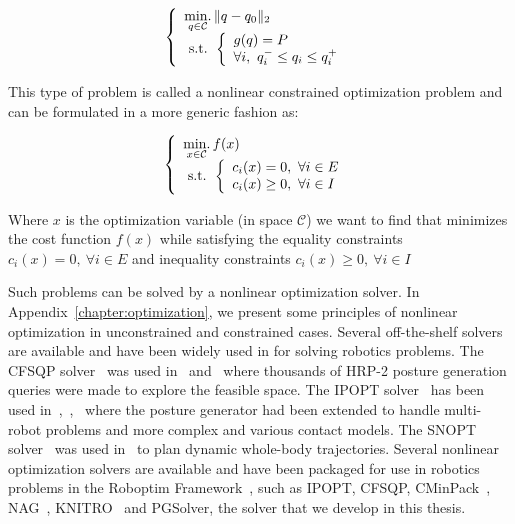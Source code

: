 \begin{equation}
  \left\{
  \begin{array}{l}
    \operatorname*{min.}\limits_{q\in\mathcal{C}}{\|q-q_0\|_2}\\
    \text{ s.t. }
    \left\{
    \begin{array}{l}
      g(q)=P\\
      \forall i,\ q_i^- \leq q_i \leq q_i^+
    \end{array}
    \right.
  \end{array}
  \right.
\end{equation}

This type of problem is called a nonlinear constrained optimization problem and can be formulated in a more generic fashion as:

\begin{equation}
\label{eq:optim_form_PG}
  \left\{
  \begin{array}{l}
    \operatorname*{min.}\limits_{x\in\mathcal{C}}{f(x)}\\
    \text{ s.t. }
    \left\{
    \begin{array}{l}
      c_i(x) = 0,\ \forall i\in{E}\\
      c_i(x) \geq 0,\ \forall i\in{I}\\
    \end{array}
    \right.
  \end{array}
  \right.
\end{equation}

Where $x$ is the optimization variable (in space $\mathcal{C}$) we want to find that minimizes the cost function $f(x)$ while satisfying the equality constraints $c_i(x) = 0,\ \forall i\in{E}$ and inequality constraints $c_i(x) \geq 0,\ \forall i\in{I}$

Such problems can be solved by a nonlinear optimization solver.
In Appendix~\ref{chapter:optimization}, we present some principles of nonlinear optimization in unconstrained and constrained cases.
Several off-the-shelf solvers are available and have been widely used in for solving robotics problems.
The CFSQP solver~\cite{cfsqp:manual} was used in~\cite{escande:iros:2009} and~\cite{escande:ras:2013} where thousands of HRP-2 posture generation queries were made to explore the feasible space.
The IPOPT solver~\cite{wachter:mathprog:2006} has been used in~\cite{vaillant:humanoids:2014},~\cite{vaillant:autonomousrobots:2016},~\cite{bouyarmane:ar:2012} where the posture generator had been extended to handle multi-robot problems and more complex and various contact models.
The SNOPT solver~\cite{gill2005snopt} was used in~\cite{dai2014whole} to plan dynamic whole-body trajectories.
Several nonlinear optimization solvers are available and have been packaged for use in robotics problems in the Roboptim Framework~\cite{moulard:jsme:2013}, such as IPOPT, CFSQP, CMinPack~\cite{cminpack}, NAG~\cite{nag}, KNITRO~\cite{knitro} and PGSolver, the solver that we develop in this thesis.

